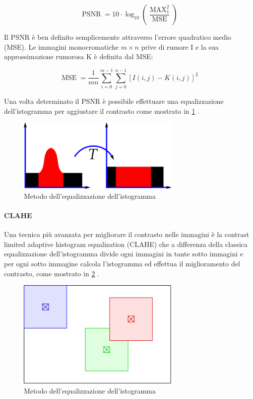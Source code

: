 \[ \operatorname{PSNR}=10 \cdot \log _{10}\left(\frac{\operatorname{MAX}_{1}^{2}}{\operatorname{MSE}}\right) \]

Il PSNR è ben definito semplicemente attraverso l'errore quadratico medio (MSE).
Le immagini monocromatiche \(m\times n\) prive di rumore I e la sua approssimazione rumorosa K è definita dal MSE:

\[ \operatorname{MSE}=\frac{1}{m n} \sum_{i=0}^{m-1} \sum_{j=0}^{n-1}[I(i, j)-K(i, j)]^{2} \]

Una volta determinato il PSNR è possibile effettuare una equalizzazione dell'istogramma per aggiustare il contrasto come mostrato in \cref{fig:histogram} \cite{pandey_contrast} \cite{permual_contrast} \cite{hummel_histogram}.

\begin{figure}[ht]
    \centering
    \includegraphics[width=0.7\textwidth]{preprocessing/histogram.png}
    \caption{Metodo dell'equalizzazione dell'istogramma}
    \label{fig:histogram}
\end{figure}

\paragraph{CLAHE}\label{clahe}

Una tecnica più avanzata per migliorare il contrasto nelle immagini è la contrast limited adaptive histogram equalization (CLAHE) che a differenza della classica equalizzazione dell'istogramma divide ogni immagini in tante sotto immagini e per ogni sotto immagine calcola l'istogramma ed effettua il miglioramento del contrasto, come mostrato in \cref{fig:clahe} \cite{hummel_histogram}.


\begin{figure}[ht]
    \centering
    \includegraphics[width=0.7\textwidth]{preprocessing/clahe.pdf}
    \caption{Metodo dell'equalizzazione dell'istogramma}
    \label{fig:clahe}
\end{figure}

